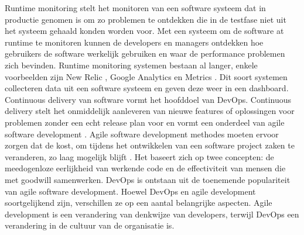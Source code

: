 Runtime monitoring stelt het monitoren van een software systeem dat in productie genomen is om zo problemen te ontdekken die in de testfase niet uit het systeem gehaald konden worden voor. Met een systeem om de software at runtime te monitoren kunnen de developers en managers ontdekken hoe gebruikers de software werkelijk gebruiken en waar de performance problemen zich bevinden. Runtime monitoring systemen bestaan al langer, enkele voorbeelden zijn New Relic \cite{NewRelic}, Google Analytics \cite{GooAna} en Metrics \cite{Metrics}. Dit soort systemen collecteren data uit een software systeem en geven deze weer in een dashboard. \\

Continuous delivery van software vormt het hoofddoel van DevOps. Continuous delivery stelt het onmiddelijk aanleveren van nieuwe features of oplossingen voor problemen zonder een echt release plan voor en vormt een onderdeel van agile software development \cite{beck2001manifesto} \cite{fowler2001agile}. Agile software development methodes moeten ervoor zorgen dat de kost, om tijdens het ontwikkelen van een software project zaken te veranderen, zo laag mogelijk blijft \cite{highsmith2001agile}. Het baseert zich op twee concepten: de meedogenloze eerlijkheid van werkende code en de effectiviteit van mensen die met goodwill samenwerken. DevOps is ontstaan uit de toenemende populariteit van agile software development. Hoewel DevOps en agile development soortgelijkend zijn, verschillen ze op een aantal belangrijke aspecten. Agile development is een verandering van denkwijze van developers, terwijl DevOps een verandering in de cultuur van de organisatie is. \\

